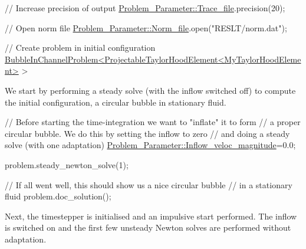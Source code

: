 \begin{DoxyCodeInclude}
 \textcolor{comment}{// Increase precision of output}
 \hyperlink{namespaceProblem__Parameter_a55310be5f2dfcb5fcfe35d71f9c16e06}{Problem\_Parameter::Trace\_file}.precision(20);

 \textcolor{comment}{// Open norm file}
 \hyperlink{namespaceProblem__Parameter_a388e06a5e637b21378ab1832e5564bec}{Problem\_Parameter::Norm\_file}.open(\textcolor{stringliteral}{"RESLT/norm.dat"});
 

 \textcolor{comment}{// Create problem in initial configuration}
 \hyperlink{classBubbleInChannelProblem}{BubbleInChannelProblem<ProjectableTaylorHoodElement<MyTaylorHoodElement>}
       > 

\end{DoxyCodeInclude}


We start by performing a steady solve (with the inflow switched off) to compute the initial configuration, a circular bubble in stationary fluid.


\begin{DoxyCodeInclude}
 \textcolor{comment}{// Before starting the time-integration we want to "inflate" it to form }
 \textcolor{comment}{// a proper circular bubble. We do this by setting the inflow to zero}
 \textcolor{comment}{// and doing a steady solve (with one adaptation)}
 \hyperlink{namespaceProblem__Parameter_a7792613e563a733ad88b8e15d126fc3a}{Problem\_Parameter::Inflow\_veloc\_magnitude}=0.0;
 
 problem.steady\_newton\_solve(1);

 \textcolor{comment}{// If all went well, this should show us a nice circular bubble}
 \textcolor{comment}{// in a stationary fluid}
 problem.doc\_solution();

\end{DoxyCodeInclude}


Next, the timestepper is initialised and an impulsive start performed. The inflow is switched on and the first few unsteady Newton solves are performed without adaptation.


